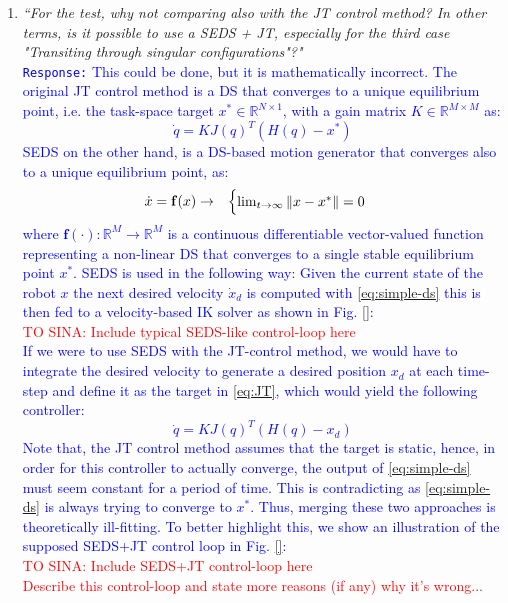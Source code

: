 \documentclass[10pt,stdletter,dateno]{newlfm}
\begin{document}
\begin{newlfm}
\begin{enumerate}
\item \textit{``For the test, why not comparing also with the JT control method? In
other terms, is it possible to use a SEDS + JT, especially for the
third case "Transiting through singular configurations"?"}\\
\textcolor{blue}{\texttt{Response:} \small This could be done, but it is mathematically incorrect. The original JT control method is a DS that converges to a unique equilibrium point, i.e. the task-space target $x^*\in \mathbb{R}^{N\times 1}$, with a gain matrix $K \in \mathbb{R}^{M\times M}$ as:\begin{equation}
\dot{q} = K J(q)^T(H(q)- x^*) 
\label{eq:JT}
\end{equation}
SEDS on the other hand, is a DS-based motion generator that converges also to a unique equilibrium point, as:
\begin{equation}
\hfill \begin{aligned}
&  \dot{x}  = \mathbf{f}(x)
\rightarrow  &
\begin{cases}
\lim_{t \rightarrow \infty}\|x - x^*\|=0
\end{cases}
\end{aligned}  \hfill
\label{eq:simple-ds}
\end{equation}
where $\mathbf{f}(\cdot): \mathbb{R}^M \rightarrow \mathbb{R}^M$ is a continuous differentiable vector-valued function representing a non-linear DS that converges to a single stable equilibrium point $x^*$. SEDS is used in the following way: Given the current state of the robot $x$ the next desired velocity $\dot{x}_d$ is computed with \eqref{eq:simple-ds} this is then fed to a velocity-based IK solver as shown in Fig. \ref{}:}\\
\textcolor{red}{TO SINA: Include typical SEDS-like control-loop here}\\
\textcolor{blue}{ \small If we were to use SEDS with the JT-control method, we would have to integrate the desired velocity to generate a desired position $x_d$ at each time-step and define it as the target in \eqref{eq:JT}, which would yield the following controller:
\begin{equation}
\dot{q} = K J(q)^T(H(q)- x_d) 
\end{equation} Note that, the JT control method assumes that the target is static, hence, in order for this controller to actually converge, the output of \eqref{eq:simple-ds} must seem constant for a period of time. This is contradicting as \eqref{eq:simple-ds} is always trying to converge to $x^*$. Thus, merging these two approaches is theoretically ill-fitting. To better highlight this, we show an illustration of the supposed SEDS+JT control loop in Fig. \ref{}:}\\
\textcolor{red}{TO SINA: Include SEDS+JT control-loop here}\\
\textcolor{red}{\small Describe this control-loop and state more reasons (if any) why it's wrong...}



\end{enumerate}
\end{newlfm}
\end{document}

